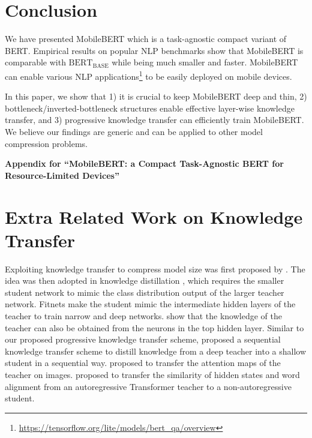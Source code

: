 \documentclass[11pt,a4paper]{article}
\begin{document}
\section{Conclusion}



We have presented MobileBERT which is a task-agnostic compact variant of BERT. Empirical results on popular NLP benchmarks show that MobileBERT is comparable with $\text{BERT}_\text{BASE}$ while being much smaller and faster. MobileBERT can enable various NLP applications\footnote{\url{https://tensorflow.org/lite/models/bert_qa/overview}} to be easily deployed on mobile devices.

In this paper, we show that 1) it is crucial to keep MobileBERT deep and thin, 2) bottleneck/inverted-bottleneck structures enable effective layer-wise knowledge transfer, and 3) progressive knowledge transfer can efficiently train MobileBERT. We believe our findings are generic and can be applied to other model compression problems.










\appendix

\begin{center}
{\bf \large{
    Appendix for ``MobileBERT: a Compact Task-Agnostic BERT for Resource-Limited Devices''}}
\end{center}

\section{Extra Related Work on Knowledge Transfer}

Exploiting knowledge transfer to compress model size was first proposed by \citet{bucilua2006model}. 
The idea was then adopted in knowledge distillation \citep{hinton2015distilling}, which requires the smaller student network to mimic the class distribution output of the larger teacher network. Fitnets \citep{romero2014fitnets} make the student mimic the intermediate hidden layers of the teacher to train narrow and deep networks. \citet{luo2016face} show that the knowledge of the teacher can also be obtained from the neurons in the top hidden layer. Similar to our proposed progressive knowledge transfer scheme, \citet{yeo2018sequential} proposed a sequential knowledge transfer scheme to distill knowledge from a deep teacher into a shallow student in a sequential way. \citet{zagoruyko2016paying} proposed to transfer the attention maps of the teacher on images. \citet{li2018hint} proposed to transfer the similarity of hidden states and word alignment from an autoregressive Transformer teacher to a non-autoregressive student.
\end{document}
